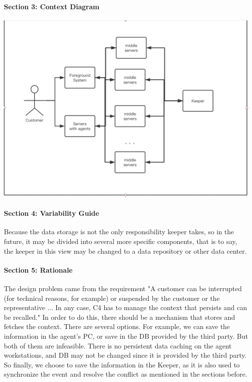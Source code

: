\documentclass{article}
\begin{document}
			\paragraph{Section 3: Context Diagram}
			\begin{center}
			\includegraphics[scale=0.3]{share2.png}
			\end{center}
			\paragraph{Section 4: Variability Guide}
			Because the data storage is not the only responsibility keeper takes, so in the future, it may be  divided into several more specific components, that is to say, the keeper in this view may be changed to a data repository or other data center.
			\paragraph{Section 5: Rationale}
			The design problem came from the requirement "A customer can be interrupted (for technical reasons, for example) or suspended by the customer or the representative ... In any case, C4 has to manage the context that persists and can be recalled."
			In order to do this, there should be a mechanism that stores and fetches the context. There are several options. For example, we can save the information in the agent's PC, or save in the DB provided by the third party. But both of them are infeasible. There is no persistent data caching on the agent workstations, and DB may not be changed since it is provided by the third party. So finally, we choose to save the information in the Keeper, as it is also used to synchronize the event and resolve the conflict as mentioned in the sections before.
\end{document}
